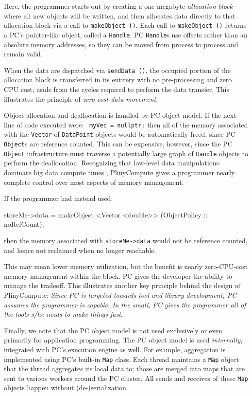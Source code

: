 \noindent
Here, the programmer starts out by creating a one megabyte \emph{allocation block} where all new objects will be written,
and then allocates data directly to that allocation block via a call to \texttt{makeObject ()}.  Each call to  \texttt{makeObject ()}
returns a PC's pointer-like object, called a \texttt{Handle}.  PC \texttt{Handle}s use offsets rather than an absolute memory
addresses, so they can be moved from process to process and remain valid.  

When the data are dispatched via \texttt{sendData ()},
the occupied
portion of the allocation block is transferred in its entirety with
no pre-processing and zero CPU cost, aside from the cycles required to perform the data transfer.  
This illustrates the principle of \emph{zero cost data movement}.

Object allocation and deallocation is handled by PC object model.
If the next line of code executed were:
\texttt{
myVec = nullptr;}
then all of the memory associated with the \texttt{Vector} of \texttt{DataPoint} objects would be automatically
freed, since PC \texttt{Object}s are reference counted.  This can
be expensive, however, since the PC \texttt{Object} infrastructure must traverse a potentially large graph of \texttt{Handle} objects to perform the deallocation.  
Recognizing that low-level data manipulations dominate big data
compute times \cite{ousterhout2015making, shi2015clash}, PlinyCompute gives a programmer nearly complete control
over most aspects of memory management.

If the 
programmer had instead used: 

\begin{code}
storeMe->data = makeObject <Vector <double>> (ObjectPolicy :: noRefCount);
\end{code}


\noindent then the memory associated with \texttt{storeMe->data} would
not be reference counted, and hence not reclaimed when no longer
reachable.  

This may mean lower memory utilization,
but the benefit is nearly zero-CPU-cost memory management within the block.
PC gives the developer the ability to manage the tradeoff.
This illustrates another key principle behind the design of
PlinyCompute: \emph{Since PC is targeted towards tool and library
  development, PC assumes the programmer is capable.  In
  the small, PC gives the programmer all of the tools s/he needs to make things fast}.

Finally, we note that the PC object model is not used exclusively or
even primarily for application programming.  The PC object model
is used \emph{internally}, integrated with PC's execution engine as well.
For example, aggregation is implemented using PC's built-in
\texttt{Map} class.  Each thread maintains
a \texttt{Map} object that the thread aggregates its local data to; those are
merged into maps that are sent to various workers around the PC
cluster.  All sends and receives of these \texttt{Map} objects happen
without (de-)serialization.


